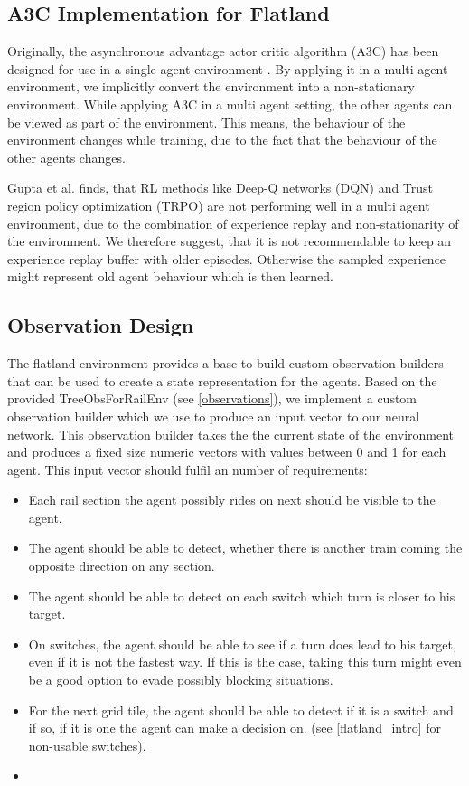 \subsection{A3C Implementation for Flatland}\label{enhanced_observations}
Originally, the asynchronous advantage actor critic algorithm (A3C) has been designed for use in a single agent environment \cite{a3c}.
By applying it in a multi agent environment, we implicitly convert the environment into a non-stationary environment.
While applying A3C in a multi agent setting, the other agents can be viewed as part of the environment. This means, the behaviour of the environment changes while training, due to the fact that the behaviour of the other agents changes. 

Gupta et al. \cite{multiagent_comp_a3c_dqn_etc} finds, that RL methods like Deep-Q networks (DQN) and Trust region policy optimization (TRPO) are not performing well in a multi agent environment, due to the combination of experience replay and non-stationarity of the environment. We therefore suggest, that it is not recommendable to keep an experience replay buffer with older episodes. Otherwise the sampled experience might represent old agent behaviour which is then learned.

\subsection{Observation Design}\label{enhanced_observations}
The flatland environment provides a base to build custom observation builders that can be used to create a state representation for the agents. Based on the provided TreeObsForRailEnv (see \autoref{observations}), we implement a custom observation builder which we use to produce an input vector to our neural network. This observation builder takes the the current state of the environment and produces a fixed size numeric vectors with values between 0 and 1 for each agent. This input vector should fulfil an number of requirements:
\begin{itemize}
	\item Each rail section the agent possibly rides on next should be visible to the agent.
	\item The agent should be able to detect, whether there is another train coming the opposite direction on any section.
	\item The agent should be able to detect on each switch which turn is closer to his target.
	\item On switches, the agent should be able to see if a turn does lead to his target, even if it is not the fastest way. If this is the case, taking this turn might even be a good option to evade possibly blocking situations.
	\item For the next grid tile, the agent should be able to detect if it is a switch and if so, if it is one the agent can make a decision on. (see \autoref{flatland_intro} for non-usable switches).
	\item 
\end{itemize}


